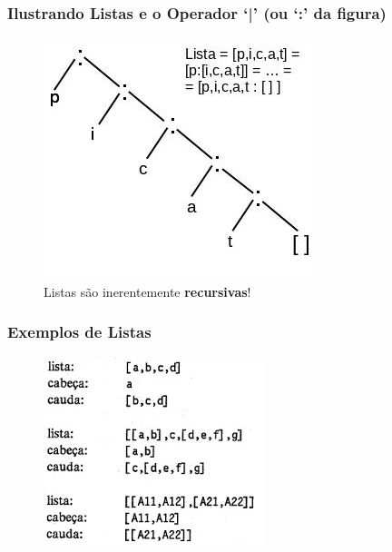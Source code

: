 \begin{frame}
  \frametitle{Ilustrando  Listas e o Operador `\textbf{|}' (ou `\textbf{:}' da figura)}
\begin{figure}[!htb]
\centering
\includegraphics[width=.7\textwidth, height=0.650\textheight]{figures/lista-picat-01.jpg}
\caption{Listas são inerentemente \textbf{recursivas}!}
\end{figure}
\end{frame}



\begin{frame}
 \frametitle{Exemplos de Listas}
\begin{figure}[!htb]
\centering
\includegraphics[width=.7\textwidth, height=0.650\textheight]{figures/exemplo_listas_01.jpg}
\end{figure}
\end{frame}



